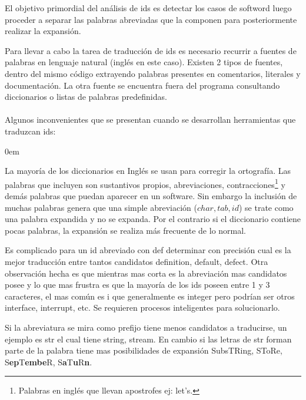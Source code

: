 \documentclass[a4paper,12pt]{report}
\begin{document}
\begin{framed}
\noindent El objetivo primordial del análisis de ids es detectar los casos de softword luego proceder a separar las palabras abreviadas que la componen para posteriormente realizar la expansión\cite{FBL06,LFBEX07}.  
\end{framed}

Para llevar a cabo la tarea de traducción de ids es necesario recurrir a fuentes de palabras en lenguaje natural (inglés en este caso). Existen 2 tipos de fuentes, dentro del mismo código extrayendo palabras presentes en comentarios, literales y documentación. La otra fuente se encuentra fuera del programa consultando diccionarios o listas de palabras predefinidas.\\\\Algunos inconvenientes que se presentan cuando se desarrollan herramientas que traduzcan ids:

\begin{description}
\itemsep0em%
\item[Dificultad para armar diccionarios apropiados:]  La mayoría de los diccionarios en Inglés se usan para corregir la ortografía. Las palabras que incluyen son sustantivos propios, abreviaciones, contracciones\footnote[1]{Palabras en inglés que llevan apostrofes ej: let's.} y demás palabras que puedan aparecer en un software. Sin embargo la inclusión de muchas palabras genera que una simple abreviación ($char,tab,id$) se trate como una palabra expandida y no se expanda. Por el contrario si el diccionario contiene pocas palabras, la expansión se realiza más frecuente de lo normal.

\item[Las abreviaciones poseen muchos candidatos a expandir:] Es complicado para un id abreviado con \textsf{def} determinar con precisión cual es la mejor traducción entre tantos candidatos \textsf{definition, default, defect}. Otra observación hecha es que mientras mas corta es la abreviación mas candidatos posee y lo que mas frustra es que la mayoría de los ids poseen entre 1 y 3 caracteres, el mas común es \textsf{i} que generalmente es \textsf{integer} pero podrían ser otros \textsf{interface, interrupt}, etc. Se requieren procesos inteligentes para solucionarlo.

\item[El tipo de la abreviación afecta el numero de candidatos:] Si la abreviatura se mira como prefijo tiene menos candidatos a traducirse, un ejemplo es \textsf{str} el cual tiene \textsf{string, stream}. En cambio si las letras de \textsf{str} forman parte de la palabra tiene mas posibilidades de expansión S\textsf{ubs}TR\textsf{ing}, ST\textsf{o}R\textsf{e}, S\textbf{ep}T\textbf{embe}R, S\textbf{a}T\textbf{u}R\textbf{n}.
\end{description}
\end{document}
